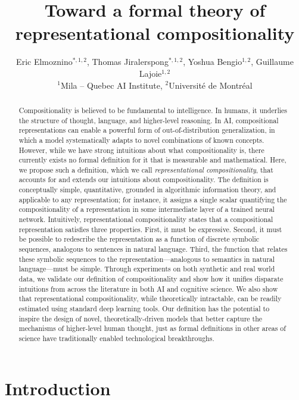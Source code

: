 \documentclass{article}
\title{Toward a formal theory of representational compositionality}
\date{} 					%
\author{
    Eric Elmoznino$^{*,1,2}$, 
    Thomas Jiralerspong$^{*,1,2}$,
    Yoshua Bengio$^{1,2}$,
    Guillaume Lajoie$^{1,2}$  \\
    $^1$Mila -- Quebec AI Institute, 
    $^2$Universit\'e de Montr\'eal
    \vphantom{
    \thanks{Equal contribution. Correspondence to: \texttt{\{eric.elmoznino,guillaume.lajoie\}@mila.quebec}.}
    }
}
\newcommand{\comp}{representational compositionality}
\begin{document}

\maketitle

\begin{abstract}
    Compositionality is believed to be fundamental to intelligence. In humans, it underlies the structure of thought, language, and higher-level reasoning. In AI, compositional representations can enable a powerful form of out-of-distribution generalization, in which a model systematically adapts to novel combinations of known concepts. However, while we have strong intuitions about what compositionality is, there currently exists no formal definition for it that is measurable and mathematical. Here, we propose such a definition, which we call \textit{\comp{}}, that accounts for and extends our intuitions about compositionality. The definition is conceptually simple, quantitative, grounded in algorithmic information theory, and applicable to any representation; for instance, it assigns a single scalar quantifying the compositionality of a representation in some intermediate layer of a trained neural network. Intuitively, \comp{} states that a compositional representation satisfies three properties. First, it must be expressive. Second, it must be possible to redescribe the representation as a function of discrete symbolic sequences, analogous to sentences in natural language. Third, the function that relates these symbolic sequences to the representation---analogous to semantics in natural language---must be simple. Through experiments on both synthetic and real world data, we validate our definition of compositionality and show how it unifies disparate intuitions from across the literature in both AI and cognitive science. We also show that \comp{}, while theoretically intractable, can be readily estimated using standard deep learning tools. Our definition has the potential to inspire the design of novel, theoretically-driven models that better capture the mechanisms of higher-level human thought, just as formal definitions in other areas of science have traditionally enabled technological breakthroughs.
\end{abstract}


\section{Introduction}
\end{document}
